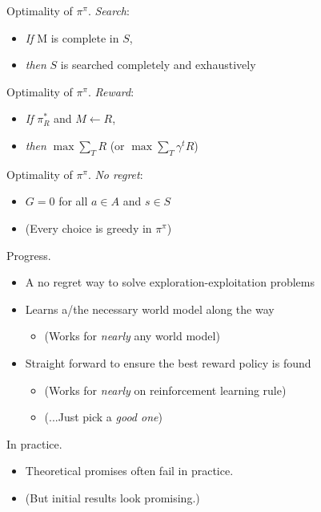 \documentclass[10pt]{beamer}
\begin{document}
\begin{frame}[fragile]{Optimality of $\pi^\pi$.}
\textit{Search}:
\begin{itemize}
\item \textit{If} M is complete in $S$, 
\item \textit{then} $S$ is searched completely and exhaustively
\end{itemize}
\end{frame}

\begin{frame}[fragile]{Optimality of $\pi^\pi$.}
\textit{Reward}:
\begin{itemize}
    \item \textit{If} $\pi^*_R$ and $M \leftarrow R$,
    \item \textit{then} $\max \sum_T R$ (or $\max \sum_T \gamma^t R$)
\end{itemize}
\end{frame}

\begin{frame}[fragile]{Optimality of $\pi^\pi$.}
\textit{No regret}:
\begin{itemize}
\item $G = 0$ for all $a \in A$ and $s \in S$
\item (Every choice is greedy in $\pi^{\pi}$)
\end{itemize}
\end{frame}

\begin{frame}[fragile]{Progress.}
\begin{itemize}
\item A no regret way to solve exploration-exploitation problems
\item Learns a/the necessary world model along the way
\begin{itemize}
    \item (Works for \textit{nearly} any world model)
\end{itemize}
\item Straight forward to ensure the best reward policy is found
\begin{itemize}
    \item (Works for \textit{nearly} on reinforcement learning rule)
    \item (...Just pick a \textit{good one})
\end{itemize}
\end{itemize}
\end{frame}

\begin{frame}[fragile]{In practice.}
\begin{itemize}
    \item \alert{Theoretical promises often fail in practice.}
    \item (But initial results look promising.)
\end{itemize}
\end{frame}
\end{document}
